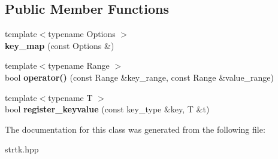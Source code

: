 \subsection*{Public Member Functions}
\begin{DoxyCompactItemize}
\item 
\hypertarget{classstrtk_1_1keyvalue_1_1key__map_a64c62f7ea6be1a002108bee49df42af0}{{\footnotesize template$<$typename Options $>$ }\\{\bfseries key\-\_\-map} (const Options \&)}\label{classstrtk_1_1keyvalue_1_1key__map_a64c62f7ea6be1a002108bee49df42af0}

\item 
\hypertarget{classstrtk_1_1keyvalue_1_1key__map_a73e9c9284c53edcb9e5ed69dfd574f1b}{{\footnotesize template$<$typename Range $>$ }\\bool {\bfseries operator()} (const Range \&key\-\_\-range, const Range \&value\-\_\-range)}\label{classstrtk_1_1keyvalue_1_1key__map_a73e9c9284c53edcb9e5ed69dfd574f1b}

\item 
\hypertarget{classstrtk_1_1keyvalue_1_1key__map_a8f647f49d2831670ddf6f1c94c0ba91e}{{\footnotesize template$<$typename T $>$ }\\bool {\bfseries register\-\_\-keyvalue} (const key\-\_\-type \&key, T \&t)}\label{classstrtk_1_1keyvalue_1_1key__map_a8f647f49d2831670ddf6f1c94c0ba91e}

\end{DoxyCompactItemize}


The documentation for this class was generated from the following file\-:\begin{DoxyCompactItemize}
\item 
strtk.\-hpp\end{DoxyCompactItemize}
